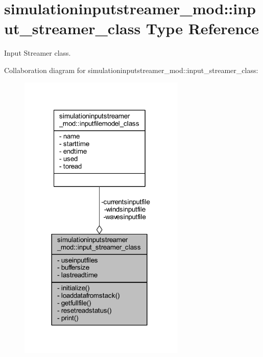 \hypertarget{structsimulationinputstreamer__mod_1_1input__streamer__class}{}\section{simulationinputstreamer\+\_\+mod\+:\+:input\+\_\+streamer\+\_\+class Type Reference}
\label{structsimulationinputstreamer__mod_1_1input__streamer__class}


Input Streamer class.  




Collaboration diagram for simulationinputstreamer\+\_\+mod\+:\+:input\+\_\+streamer\+\_\+class\+:\nopagebreak
\begin{figure}[H]
\begin{center}
\leavevmode
\includegraphics[width=225pt]{structsimulationinputstreamer__mod_1_1input__streamer__class__coll__graph}
\end{center}
\end{figure}
